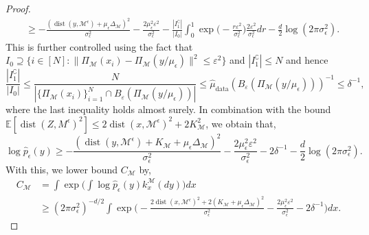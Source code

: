 \documentclass[10pt]{article}
\theoremstyle{plain}
\theoremstyle{definition}
\theoremstyle{remark}
\newcommand{\M}{{\mathcal{M}}}
\newcommand{\E}{\mathbb{E}}
\newcommand{\hmud}{\hat{\mu}_{\operatorname{data}}}
\newcommand{\dist}{\operatorname{dist}}
\newcommand{\gap}{\Delta_\M}
\begin{document}
\begin{proof}
\begin{align*}
    &\geq -\frac{(\dist(y, \M^\epsilon) + \mu_\epsilon \gap)^2}{\sigma_\epsilon^2} - \frac{2 \mu_\epsilon^2 \varepsilon^2}{\sigma_\epsilon^2} - \frac{|I_1^\complement|}{|I_0|} \int_0^1 \exp \bigg ( -\frac{r\varepsilon^2}{\sigma_\epsilon^2} \bigg ) \frac{2\varepsilon^2}{\sigma_\epsilon^2} dr - \frac{d}{2}\log(2 \pi \sigma_\epsilon^2).
\end{align*}
This is further controlled using the fact that \(I_0 \supseteq \{i \in [N]: \|\Pi_\M(x_i) - \Pi_\M(y/\mu_\epsilon)\|^2 \leq \varepsilon^2\}\) and \(|I_1^\complement| \leq N\) and hence
\begin{equation*}
    \frac{|I_1^\complement|}{|I_0|} \leq \frac{N}{|\{\Pi_\M(x_i)\}_{i=1}^N \cap B_\varepsilon(\Pi_\M(y/\mu_\epsilon))|} \leq \hmud(B_\varepsilon(\Pi_\M(y/\mu_\epsilon)))^{-1} \leq \delta^{-1},
\end{equation*}
where the last inequality holds almost surely. In combination with the bound \(\E[\dist(Z, M^\epsilon)^2] \leq 2 \dist(x, \M^\epsilon)^2 + 2K_\M^2\), we obtain that,
\begin{equation}\label{eq:log_bound}
    \log \hat{p}_\epsilon(y) \geq -\frac{(\dist(y, \M^\epsilon) + K_\M + \mu_\epsilon \gap)^2}{\sigma_\epsilon^2} - \frac{2\mu_\epsilon^2\varepsilon^2}{\sigma_\epsilon^2} - 2 \delta^{-1} - \frac{d}{2}\log(2 \pi \sigma_\epsilon^2).
\end{equation}
With this, we lower bound \(C_\M\) by,
\begin{align}
    C_\M &= \int \exp \bigg ( \int \log \hat{p}_\epsilon(y) k_x^\M(dy) \bigg ) dx \nonumber\\
    &\geq (2 \pi \sigma_\epsilon^2)^{-d/2} \int \exp \bigg ( -\frac{2\dist(x, \M^\epsilon)^2 + 2(K_\M + \mu_\epsilon \gap)^2}{\sigma_\epsilon^2} - \frac{2\mu_\epsilon^2\varepsilon^2}{\sigma_\epsilon^2} - 2 \delta^{-1} \bigg ) dx.\label{eq:man_conc_simple_4}
\end{align}


\end{proof}
\end{document}
